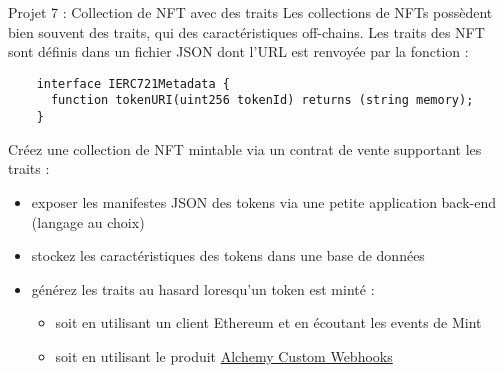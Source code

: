 \begin{frame}[fragile]{Projet 7 : Collection de NFT avec des traits}
  Les collections de NFTs possèdent bien souvent des traits, qui des caractéristiques off-chains.
  Les traits des NFT sont définis dans un fichier JSON dont l'URL est renvoyée par la fonction :

  \begin{verbatim}
    interface IERC721Metadata {
      function tokenURI(uint256 tokenId) returns (string memory);
    }
  \end{verbatim}

  Créez une collection de NFT mintable via un contrat de vente supportant les traits :

  \begin{itemize}
    \item exposer les manifestes JSON des tokens via une petite application back-end (langage au choix)
    \item stockez les caractéristiques des tokens dans une base de données
    \item générez les traits au hasard loresqu'un token est minté :
          \begin{itemize}
            \item soit en utilisant un client Ethereum et en écoutant les events de Mint
            \item soit en utilisant le produit \href{https://www.alchemy.com/notify/custom-webhooks}{Alchemy Custom Webhooks}
          \end{itemize}
  \end{itemize}
\end{frame}